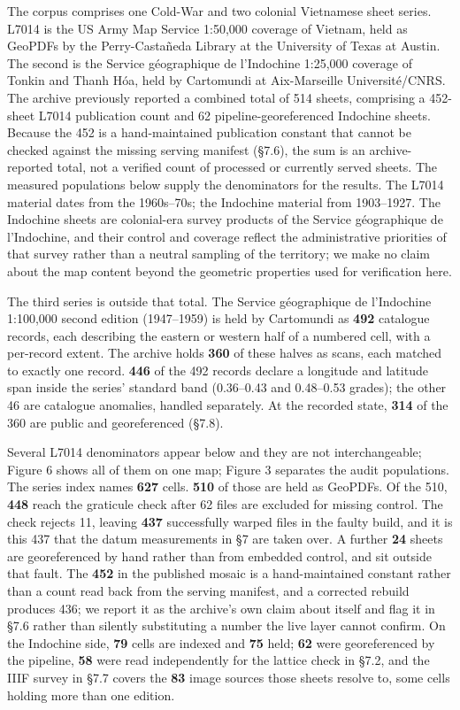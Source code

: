 \documentclass[11pt,a4paper]{article}
\begin{document}
The corpus comprises one Cold-War and two colonial Vietnamese sheet series. L7014 is the US Army Map Service 1:50,000 coverage of Vietnam, held as GeoPDFs by the Perry-Castañeda Library at the University of Texas at Austin. The second is the Service géographique de l'Indochine 1:25,000 coverage of Tonkin and Thanh Hóa, held by Cartomundi at Aix-Marseille Université/CNRS. The archive previously reported a combined total of 514 sheets, comprising a 452-sheet L7014 publication count and 62 pipeline-georeferenced Indochine sheets. Because the 452 is a hand-maintained publication constant that cannot be checked against the missing serving manifest (§7.6), the sum is an archive-reported total, not a verified count of processed or currently served sheets. The measured populations below supply the denominators for the results. The L7014 material dates from the 1960s–70s; the Indochine material from 1903–1927. The Indochine sheets are colonial-era survey products of the Service géographique de l'Indochine, and their control and coverage reflect the administrative priorities of that survey rather than a neutral sampling of the territory; we make no claim about the map content beyond the geometric properties used for verification here.

The third series is outside that total. The Service géographique de l'Indochine 1:100,000 second edition (1947–1959) is held by Cartomundi as \textbf{492} catalogue records, each describing the eastern or western half of a numbered cell, with a per-record extent. The archive holds \textbf{360} of these halves as scans, each matched to exactly one record. \textbf{446} of the 492 records declare a longitude and latitude span inside the series' standard band (0.36–0.43 and 0.48–0.53 grades); the other 46 are catalogue anomalies, handled separately. At the recorded state, \textbf{314} of the 360 are public and georeferenced (§7.8).

Several L7014 denominators appear below and they are not interchangeable; Figure 6 shows all of them on one map; Figure 3 separates the audit populations. The series index names \textbf{627} cells. \textbf{510} of those are held as GeoPDFs. Of the 510, \textbf{448} reach the graticule check after 62 files are excluded for missing control. The check rejects 11, leaving \textbf{437} successfully warped files in the faulty build, and it is this 437 that the datum measurements in §7 are taken over. A further \textbf{24} sheets are georeferenced by hand rather than from embedded control, and sit outside that fault. The \textbf{452} in the published mosaic is a hand-maintained constant rather than a count read back from the serving manifest, and a corrected rebuild produces 436; we report it as the archive's own claim about itself and flag it in §7.6 rather than silently substituting a number the live layer cannot confirm. On the Indochine side, \textbf{79} cells are indexed and \textbf{75} held; \textbf{62} were georeferenced by the pipeline, \textbf{58} were read independently for the lattice check in §7.2, and the IIIF survey in §7.7 covers the \textbf{83} image sources those sheets resolve to, some cells holding more than one edition.
\end{document}
